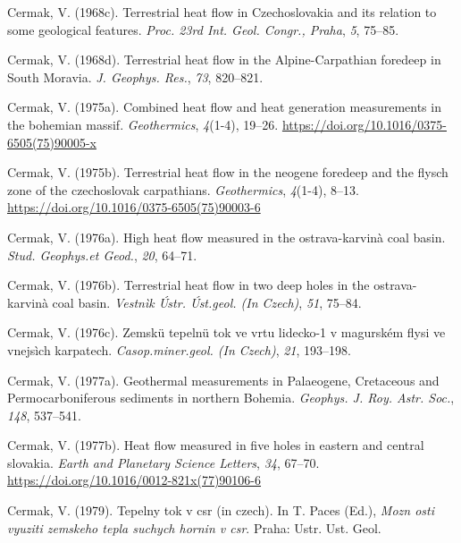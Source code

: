 \documentclass[draft,linenumbers]{agujournal2018}
\begin{document}
\leavevmode{}%
Cermak, V. (1968c). Terrestrial heat flow in {Czechoslovakia} and its
relation to some geological features. \emph{Proc. 23rd Int. Geol.
Congr., Praha}, \emph{5}, 75--85.

\leavevmode{}%
Cermak, V. (1968d). Terrestrial heat flow in the {Alpine-Carpathian}
foredeep in {South Moravia}. \emph{J. Geophys. Res.}, \emph{73},
820--821.

\leavevmode{}%
Cermak, V. (1975a). Combined heat flow and heat generation measurements
in the bohemian massif. \emph{Geothermics}, \emph{4}(1-4), 19--26.
\url{https://doi.org/10.1016/0375-6505(75)90005-x}

\leavevmode{}%
Cermak, V. (1975b). Terrestrial heat flow in the neogene foredeep and
the flysch zone of the czechoslovak carpathians. \emph{Geothermics},
\emph{4}(1-4), 8--13. \url{https://doi.org/10.1016/0375-6505(75)90003-6}

\leavevmode{}%
Cermak, V. (1976a). High heat flow measured in the ostrava-karvinà coal
basin. \emph{Stud. Geophys.et Geod.}, \emph{20}, 64--71.

\leavevmode{}%
Cermak, V. (1976b). Terrestrial heat flow in two deep holes in the
ostrava-karvinà coal basin. \emph{Vestnìk Ústr. Úst.geol. (In Czech)},
\emph{51}, 75--84.

\leavevmode{}%
Cermak, V. (1976c). Zemskü tepelnü tok ve vrtu lidecko-1 v magurském
flysi ve vnejsìch karpatech. \emph{Casop.miner.geol. (In Czech)},
\emph{21}, 193--198.

\leavevmode{}%
Cermak, V. (1977a). Geothermal measurements in {Palaeogene, Cretaceous
and Permocarboniferous} sediments in northern {Bohemia}. \emph{Geophys.
J. Roy. Astr. Soc.}, \emph{148}, 537--541.

\leavevmode{}%
Cermak, V. (1977b). Heat flow measured in five holes in eastern and
central slovakia. \emph{Earth and Planetary Science Letters}, \emph{34},
67--70. \url{https://doi.org/10.1016/0012-821x(77)90106-6}

\leavevmode{}%
Cermak, V. (1979). Tepelny tok v csr (in czech). In T. Paces (Ed.),
\emph{Mozn osti vyuziti zemskeho tepla suchych hornin v csr}. Praha:
Ustr. Ust. Geol.
\end{document}
